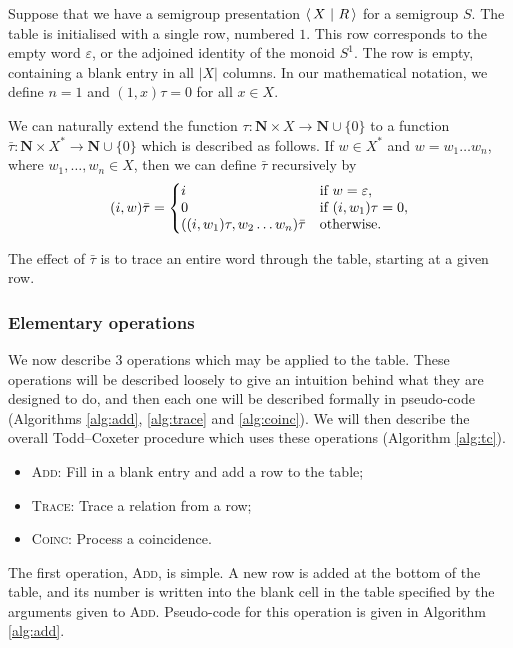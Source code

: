 Suppose that we have a semigroup presentation $\left\langle\,X ~\middle|~ R\,\right\rangle$ for a semigroup
$S$.  The table is initialised with a single row, numbered $1$.  This row
corresponds to the empty word $\varepsilon$, or the adjoined identity of the
monoid $S^1$.  The row is empty, containing a blank entry in all $|X|$ columns.
In our mathematical notation, we define $n=1$ and
$(1,x)\tau = 0$ for all $x \in X$.

We can naturally extend the function
$\tau: \mathbf{N} \times X \to \mathbf{N} \cup \{0\}$
to a function
$\bar{\tau}: \mathbf{N} \times X^* \to \mathbf{N} \cup \{0\}$
which is described as follows.
If $w \in X^*$ and $w=w_1 \ldots w_n$, where $w_1, \ldots, w_n \in X$,
then we can define $\bar\tau$ recursively by
$$
(i, w)\bar\tau = \left\{
\begin{matrix*}[l]
  i & \textnormal{if~} w=\varepsilon,\\
  0 & \textnormal{if~} (i, w_1)\tau=0,\\
  ((i, w_1)\tau, w_2 \ldots w_n)\bar\tau & \textnormal{otherwise}.
\end{matrix*} \right.
$$

The effect of $\bar\tau$ is to trace an entire word through the table, starting
at a given row.

\subsubsection{Elementary operations}

We now describe 3 operations which may be applied to the table.  These
operations will be described loosely to give an intuition behind what they are
designed to do, and then each one will be described formally in pseudo-code
(Algorithms \ref{alg:add}, \ref{alg:trace} and \ref{alg:coinc}).  We will then
describe the overall Todd--Coxeter procedure which uses these operations
(Algorithm \ref{alg:tc}).

\begin{itemize}
\item \textsc{Add}: Fill in a blank entry and add a row to the table;
\item \textsc{Trace}: Trace a relation from a row;
\item \textsc{Coinc}: Process a coincidence.
\end{itemize}

The first operation, \textsc{Add}, is simple.  A new row is added at the bottom
of the table, and its number is written into the blank cell in the table
specified by the arguments given to \textsc{Add}.  Pseudo-code for this
operation is given in Algorithm \ref{alg:add}.

